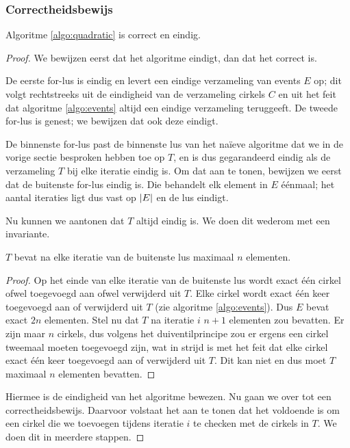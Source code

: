 \subsubsection{Correctheidsbewijs}
\begin{stl} Algoritme \ref{algo:quadratic} is correct en eindig.\end{stl}
\begin{proof}
We bewijzen eerst dat het algoritme eindigt, dan dat het correct
is. 

De eerste for-lus is eindig en levert een eindige verzameling van
events $E$ op; dit volgt rechtstreeks uit de eindigheid van de
verzameling cirkels $C$ en uit het feit dat algoritme
\ref{algo:events} altijd een eindige verzameling teruggeeft. De tweede
for-lus is genest; we bewijzen dat ook deze eindigt.

De binnenste for-lus past de binnenste lus van het na\"ieve algoritme
dat we in de vorige sectie besproken hebben toe op $T$, en is dus
gegarandeerd eindig als de verzameling $T$ bij elke iteratie eindig
is. Om dat aan te tonen, bewijzen we eerst dat de buitenste for-lus
eindig is.  Die behandelt elk element in $E$ \'e\'enmaal; het aantal
iteraties ligt dus vast op $\left|E\right|$ en de lus eindigt.

Nu kunnen we aantonen dat $T$ altijd eindig is. We doen dit wederom
met een invariante.

\begin{inv}
$T$ bevat na elke iteratie van de buitenste lus maximaal $n$ elementen.
\end{inv}

\begin{proof}
Op het einde van elke iteratie van de buitenste lus wordt exact
\'e\'en cirkel ofwel toegevoegd aan ofwel verwijderd uit $T$. Elke
cirkel wordt exact \'e\'en keer toegevoegd aan of verwijderd uit $T$
(zie algoritme \ref{algo:events}). Dus $E$ bevat exact $2n$
elementen. Stel nu dat $T$ na iteratie $i$ $n + 1$ elementen zou
bevatten. Er zijn maar $n$ cirkels, dus volgens het duiventilprincipe
zou er ergens een cirkel tweemaal moeten toegevoegd zijn, wat in
strijd is met het feit dat elke cirkel exact \'e\'en keer
toegevoegd aan of verwijderd uit $T$. Dit kan niet en dus moet $T$
maximaal $n$ elementen bevatten. 
\end{proof} 

Hiermee is de eindigheid van het algoritme bewezen. Nu gaan we over
tot een correctheidsbewijs. Daarvoor volstaat het aan te tonen dat het
voldoende is om een cirkel die we toevoegen tijdens iteratie $i$ te
checken met de cirkels in $T$. We doen dit in meerdere stappen.


\end{proof}
